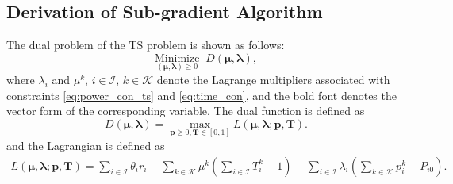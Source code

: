 \documentclass[conference]{IEEEtran}
\newcommand{\mi}{\mathcal{I}}
\newcommand{\mk}{\mathcal{K}}
\newcommand{\bb}{\boldsymbol}
\begin{document}
\appendix

\subsection{Derivation of Sub-gradient Algorithm}
The dual problem of the TS problem is shown as follows:
\begin{equation}
\label{eq:dual_fun}
    \underset{(\bb{\mu},\bb{\lambda})\ge 0}{\text{Minimize}}\;\; D(\bb{\mu},\bb{\lambda}),
\end{equation}
where $\lambda_i$ and $\mu^k$, $i\in\mi$, $k\in\mk$ denote the Lagrange multipliers associated with constraints \eqref{eq:power_con_ts} and \eqref{eq:time_con}, and the bold font denotes the vector form of the corresponding variable.  The dual function is defined as
\begin{equation}
    D(\bb{\mu},\bb{\lambda})=\max_{\bb{p}\ge 0, \bb{T}\in [0,1]}L(\bb{\mu},\bb{\lambda};\bb{p},\bb{T}).
\end{equation}
and the Lagrangian is defined as
\begin{align*}
L(\bb{\mu},\bb{\lambda};\bb{p},\bb{T})\!=\!\!\!\sum_{i\in\mi}\!\theta_ir_i \!-\!\!\!\sum_{k\in\mk}\!\!\mu^k\!\!\left(\!\sum_{i\in\mi}T_i^k\!-\!1\!\!\right)\!\!-\!\!\sum_{i\in\mi}\!\!\lambda_i\!\!\left(\!\sum_{k\in\mk}p_i^k\!-\!\!P_{i0}\!\!\right)\!.
\end{align*}
\end{document}
